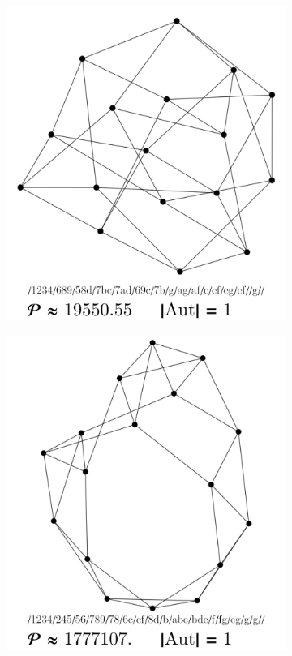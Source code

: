 \documentclass[11pt,a4paper]{article}
\renewcommand{\|}{\rule[-0.4ex]{0.2ex}{1.2em}}
\begin{document}
\begin{figure}[htb]
\begin{subfigure}[b]{.24 \textwidth}
		\includegraphics[width=\linewidth]{smallest_15_2}
		\subcaption{}
	\end{subfigure}
	\begin{subfigure}[b]{.24 \textwidth}
		\includegraphics[width=\linewidth]{largest_15_2}

\end{subfigure}
\end{figure}
\end{document}
